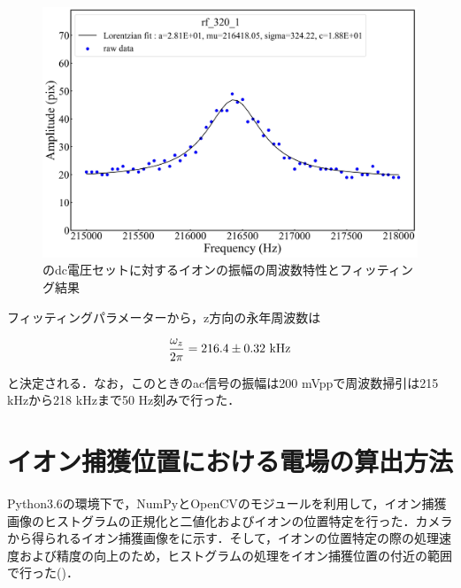 \begin{figure}[h]
	\centering
		\includegraphics[width = 0.6\linewidth]{./methods/figure/fitting_result.jpg}
		\caption{のdc電圧セットに対するイオンの振幅の周波数特性とフィッティング結果}
		\label{fig:fitting_result}
\end{figure}

フィッティングパラメーターから，z方向の永年周波数は

\begin{align}
\frac{\omega_z}{2\pi} = 216.4 \pm 0.32 \  {\rm kHz} \notag
\end{align}

と決定される．なお，このときのac信号の振幅は200 mVppで周波数掃引は215 kHzから218 kHzまで50 Hz刻みで行った．

\clearpage

\section{イオン捕獲位置における電場の算出方法}

Python3.6の環境下で，NumPyとOpenCVのモジュールを利用して，イオン捕獲画像のヒストグラムの正規化と二値化およびイオンの位置特定を行った．カメラから得られるイオン捕獲画像をに示す．そして，イオンの位置特定の際の処理速度および精度の向上のため，ヒストグラムの処理をイオン捕獲位置の付近の範囲で行った()．

